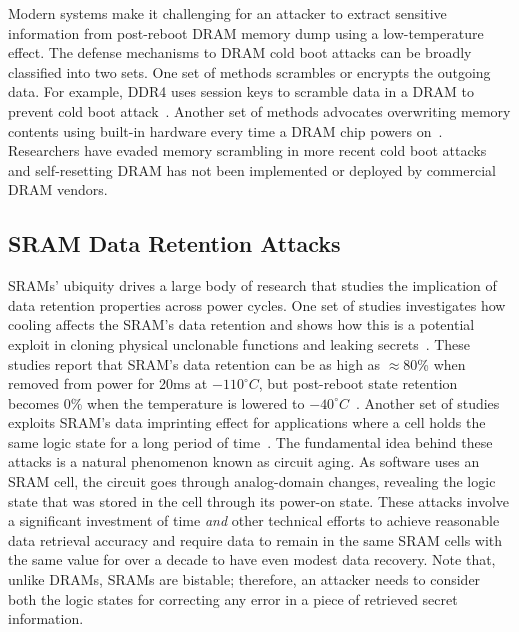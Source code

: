 Modern systems make it challenging for an attacker to extract sensitive information from post-reboot DRAM memory dump using a low-temperature effect.
The defense mechanisms to DRAM cold boot attacks can be broadly classified into two sets. One set of methods scrambles or encrypts the outgoing data.
For example, DDR4 uses session keys to scramble data in a DRAM to prevent cold boot attack~\cite{yitbarek_cold_2017}.
Another set of methods advocates overwriting memory contents using built-in hardware every time a DRAM chip powers on~\cite{codic,8862904}.
Researchers have evaded memory scrambling in more recent cold boot attacks~\cite{yitbarek_cold_2017} and self-resetting DRAM has not been implemented or deployed by commercial DRAM vendors. 

\subsection{SRAM Data Retention Attacks}

SRAMs' ubiquity drives a large body of research that studies the implication of data retention properties across power cycles. 
One set of studies investigates how cooling affects the SRAM's data retention and shows how this is a potential exploit in cloning physical unclonable functions and leaking secrets~\cite{anagnostopoulos2018low,anagnostopoulos2019attacking,skorobogatov2002low,gutmann2001data,cakir20126t}.
These studies report that SRAM's data retention can be as high as $\approx$80\%  when removed from power for 20ms at $-110^\circ C$,  but post-reboot state retention becomes 0\% when the temperature is lowered to $-40^\circ C$~\cite{anagnostopoulos2018low}. 
Another set of studies exploits SRAM's data imprinting effect for applications where a cell holds the same logic state for a long period of time~\cite{williams2020silicon,cakir20126t,liu2016sram,maiti2011impact}.
The fundamental idea behind these attacks is a natural phenomenon known as circuit aging. 
As software uses an SRAM cell, the circuit goes through analog-domain changes, revealing the logic state that was stored in the cell through its power-on state. 
These attacks involve a significant investment of time \textit{and} other technical efforts to achieve reasonable data retrieval accuracy and require data to remain in the same SRAM cells with the same value for over a decade to have even modest data recovery.
Note that, unlike DRAMs, SRAMs are bistable; therefore, an attacker needs to consider both the logic states for correcting any error in a piece of retrieved secret information. 
